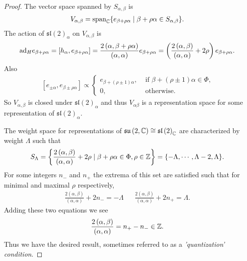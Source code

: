 \begin{proof}
    The vector space spanned by $S_{\alpha , \beta}$ is
    \begin{align}
        V_{\alpha, \beta} = \text{span}_{\mathbb{C}} \{e_{\beta + \rho \alpha}  \mid \beta + \rho \alpha \in S_{\alpha, \beta}\} 
    .\end{align}
    The action of $\mathfrak{sl}\left( 2 \right)_\alpha$ on $V_{\alpha, \beta}$ is
    \begin{align}
        \text{ad}_H e_{\beta + \rho \alpha} = \left[ h_{\alpha}, e_{\beta + \rho \alpha}  \right] = \frac{2 \left( \alpha, \beta + \rho \alpha \right) }{\left( \alpha , \alpha \right) } e_{\beta + \rho \alpha} = \left( \frac{2\left( \alpha , \beta \right) }{\left( \alpha , \alpha \right) } + 2 \rho \right) e_{\beta + \rho \alpha}
    .\end{align}
    Also 
    \begin{align}
        \left[ e_{\pm \alpha}, e_{\beta \pm \rho \alpha} \right] \propto \begin{cases}
            e_{\beta + \left( \rho \pm 1 \right)\alpha }, & \text{~if $\beta + \left( \rho \pm 1 \right) \alpha \in \Phi$,} \\
            0, & \text{~otherwise.}
        \end{cases}
    \end{align}
    So $V_{\alpha, \beta}$ is closed under $\mathfrak{sl}\left( 2 \right)_{\alpha}$ and thus $V_{\alpha \beta}$ is a representation space for some representation of $\mathfrak{sl}\left( 2 \right)_{\alpha}$. 

    The weight space for representations of $\mathfrak{su}\left( 2, \mathbb{C} \right) \cong \mathfrak{sl}\left( 2 \right)_{\mathbb{C}}$ are characterized by weight $\Lambda$ such that
    \begin{align}
        S_{\Lambda} = \left\{ \frac{2 \left( \alpha, \beta \right) }{\left( \alpha, \alpha \right) } + 2 \rho  \mid \beta + \rho \alpha \in \Phi, \rho \in \mathbb{Z} \right\}  = \{-\Lambda, \cdots, \Lambda - 2, \Lambda\} 
    .\end{align}
    For some integers $n_-$ and $n_+$ the extrema of this set are satisfied such that for minimal and maximal $\rho$ respectively,
    \begin{align}
        \frac{2 \left( \alpha, \beta \right) }{\left( \alpha , \alpha \right) } + 2 n_- = - \Lambda && \frac{2 \left( \alpha, \beta \right) }{\left( \alpha, \alpha \right) } + 2n_+ = \Lambda
    .\end{align}
    Adding these two equations we see
    \begin{align}
        \frac{2 \left( \alpha, \beta \right) }{\left( \alpha, \alpha \right) } = n_+ - n_- \in \mathbb{Z}
    .\end{align}
    Thus we have the desired result, sometimes referred to as a \textit{'quantization' condition}.
\end{proof}

